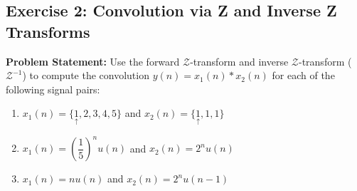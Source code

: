 \documentclass[12pt,a4paper]{article}
\newcommand{\org}[1]{\underset{\uparrow}{#1}}
\begin{document}
\subsection{Exercise 2: Convolution via Z and Inverse Z Transforms}
\textbf{Problem Statement:} Use the forward $\mathcal{Z}$-transform and inverse $\mathcal{Z}$-transform ($\mathcal{Z}^{-1}$) to compute the convolution $y(n) = x_1(n) * x_2(n)$ for each of the following signal pairs:
\begin{enumerate}[label=(\alph*)]
    \item $x_1(n) = \{\org{1}, 2, 3, 4, 5\}$ \quad and \quad $x_2(n) = \{\org{1}, 1, 1\}$
    \item $x_1(n) = \left(\dfrac{1}{5}\right)^n u(n)$ \quad and \quad $x_2(n) = 2^n u(n)$
    \item $x_1(n) = n u(n)$ \quad and \quad $x_2(n) = 2^n u(n-1)$
\end{enumerate}
\end{document}
